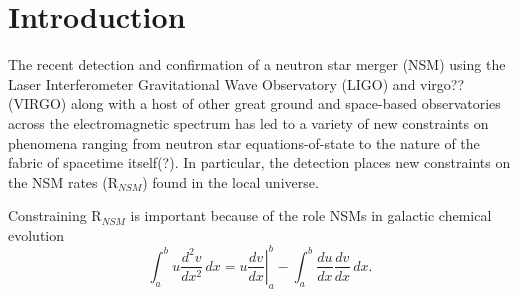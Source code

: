 \section{Introduction}
\label{intro} 
The recent detection and confirmation of a neutron star merger (NSM) using the Laser Interferometer Gravitational Wave Observatory (LIGO) and virgo?? (VIRGO) along with a host of other great ground and space-based observatories across the electromagnetic spectrum has led to a variety of new constraints on phenomena ranging from neutron star equations-of-state to the nature of the fabric of spacetime itself(?). In particular, the detection places new constraints on the NSM rates (R$_{NSM}$) found in the local universe. 

Constraining R$_{NSM}$ is important because of the role NSMs  in galactic chemical evolution 
\begin{equation}
\label{eqn:drag}
	\int_a^bu\frac{d^2v}{dx^2}\,dx
	=\left.u\frac{dv}{dx}\right|_a^b
	-\int_a^b\frac{du}{dx}\frac{dv}{dx}\,dx.
\end{equation}
